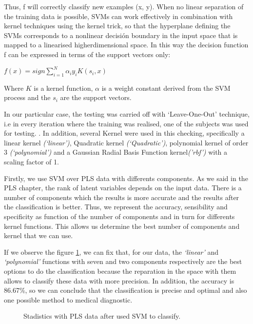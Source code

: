 Thus, f will correctly classify new examples (x, y). When no linear separation of the training data is possible, SVMs can work effectively in combination with kernel techniques using the kernel trick, so that the hyperplane defining the SVMs corresponds to a nonlinear decisión boundary in the input space that is mapped to a linearised higherdimensional space. In this way the decision function f can be expressed in terms of the support vectors only\cite{Gorriz}:

\begin{center}
	$f(x) = sign{\sum_{i=1}^{N} \alpha_{i}y_{i}K(s_{i},x)}$
\end{center}

Where $K$ is a kernel function, $\alpha$ is a weight constant derived from the SVM process and the $s_{i}$ are the support vectors. 

In our particular case, the testing was carried off with ‘Leave-One-Out’ technique, i.e in every iteration where the training was realised, one of the subjects was used for testing. . In addition, several Kernel were used in this checking, specifically a linear kernel \textit{(‘linear’)}, Quadratic kernel \textit{(‘Quadratic’)}, polynomial kernel of order 3 \textit{(‘polynomial’)} and a Gaussian Radial Basis Function kernel\textit{('rbf')} with a scaling factor of 1.

Firstly, we use SVM over PLS data with differents components. As we said in the PLS chapter, the rank of latent variables depends on the input data. There is a number of components which the results is more accurate and the results after the classification is better. Thus, we represent the accuracy, sensibility and specificity as function of the number of components and in turn for differents kernel functions. This allows us determine the best number of components and  kernel that we can use.

If we observe the figure \ref{fig:stadistics_PLS}, we can fix that, for our data, the \textit{‘linear’} and \textit{‘polynomial’} functions with seven and two components respectively are the best options to do the classification because the reparation in the space with them allows to classify these data with more precision.  In addition, the accuracy is 86.67\%, so we can conclude that the classification is precise and optimal and also one possible method to medical diagnostic.

\begin{figure}[H]
	\centering
	\caption{Stadistics with PLS data after used SVM to classify.}
	\label{fig:stadistics_PLS}
\end{figure}

